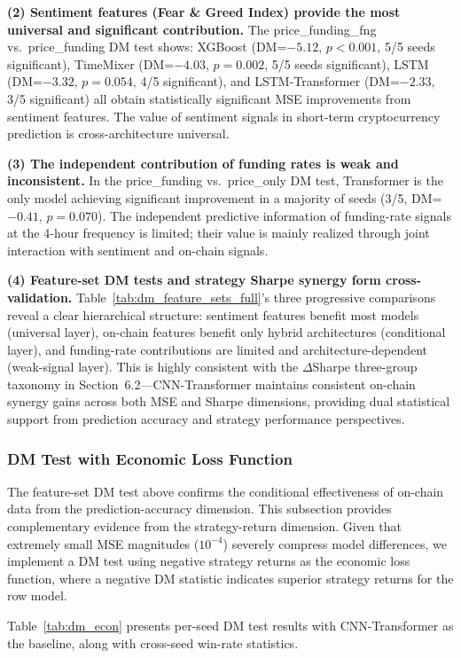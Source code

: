 \documentclass[a4paper]{cas-dc}
\begin{document}
\textbf{(2) Sentiment features (Fear \& Greed Index) provide the most universal and significant contribution.} The price\_funding\_fng vs.\ price\_funding DM test shows: XGBoost (DM=$-5.12$, $p<0.001$, 5/5 seeds significant), TimeMixer (DM=$-4.03$, $p=0.002$, 5/5 seeds significant), LSTM (DM=$-3.32$, $p=0.054$, 4/5 significant), and LSTM-Transformer (DM=$-2.33$, 3/5 significant) all obtain statistically significant MSE improvements from sentiment features. The value of sentiment signals in short-term cryptocurrency prediction is cross-architecture universal.

\textbf{(3) The independent contribution of funding rates is weak and inconsistent.} In the price\_funding vs.\ price\_only DM test, Transformer is the only model achieving significant improvement in a majority of seeds (3/5, DM=$-0.41$, $p=0.070$). The independent predictive information of funding-rate signals at the 4-hour frequency is limited; their value is mainly realized through joint interaction with sentiment and on-chain signals.

\textbf{(4) Feature-set DM tests and strategy Sharpe synergy form cross-validation.} Table~\ref{tab:dm_feature_sets_full}'s three progressive comparisons reveal a clear hierarchical structure: sentiment features benefit most models (universal layer), on-chain features benefit only hybrid architectures (conditional layer), and funding-rate contributions are limited and architecture-dependent (weak-signal layer). This is highly consistent with the $\Delta$Sharpe three-group taxonomy in Section~6.2---CNN-Transformer maintains consistent on-chain synergy gains across both MSE and Sharpe dimensions, providing dual statistical support from prediction accuracy and strategy performance perspectives.

\subsubsection{DM Test with Economic Loss Function}

The feature-set DM test above confirms the conditional effectiveness of on-chain data from the prediction-accuracy dimension. This subsection provides complementary evidence from the strategy-return dimension. Given that extremely small MSE magnitudes ($10^{-4}$) severely compress model differences, we implement a DM test using negative strategy returns as the economic loss function, where a negative DM statistic indicates superior strategy returns for the row model.

Table~\ref{tab:dm_econ} presents per-seed DM test results with CNN-Transformer as the baseline, along with cross-seed win-rate statistics.
\end{document}
